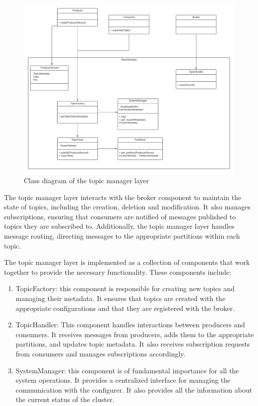 \begin{figure}[H]
    \centering
    \includegraphics[width=1.0\textwidth]{Figures/class_diagram_topic_manager.png}
    \caption{Class diagram of the topic manager layer}
    \label{fig:class_diagram_topic_manager}
\end{figure}

The topic manager layer interacts with the broker component to maintain the
state of topics, including the creation, deletion and modification.
It also manages subscriptions, ensuring that consumers are notified of messages
published to topics they are subscribed to. Additionally, the topic manager
layer handles message routing, directing messages to the appropriate partitions
within each topic.

The topic manager layer is implemented as a collection of components that work
together to provide the necessary functionality. These components include:

\begin{enumerate}
    \item   TopicFactory: this component is responsible for creating new
            topics and managing their metadata. It ensures that topics are
            created with the appropriate configurations and that they are
            registered with the broker.
    \item   TopicHandler: This component handles interactions between producers
            and consumers. It receives messages from producers, adds them to
            the appropriate partitions, and updates topic metadata. It also
            receives subscription requests from consumers and manages
            subscriptions accordingly.
    \item   SystemManager: this component is of fundamental importance for all
            the system operations. It provides a centralized interface for
            managing the communication with the configurer. It also provides
            all the information about the current status of the cluster.
\end{enumerate}

